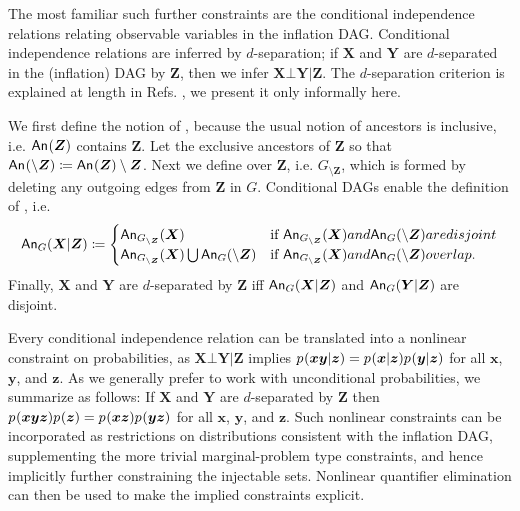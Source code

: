 {\begin{asparadesc}
\medskip\item[\tred{Conditional Independence Relations}] \noindent
\par\hspace{\parskip} 
The most familiar such further constraints are the conditional independence relations relating observable variables in the inflation DAG. Conditional independence relations are inferred by $d$-separation; if $\bm{X}$ and $\bm{Y}$ are $d$-separated in the (inflation) DAG by $\bm{Z}$, then we infer $\bm{X}\bot\bm{Y}|\bm{Z}$. The $d$-separation criterion is explained at length in Refs. \cite{pearl2009causality,studeny2005probabilistic,WoodSpekkens,pusey2014gdag}, we present it only informally here.

We first define the notion of , because the usual notion of ancestors is inclusive, i.e. $\An{\bm{Z}}$ contains $\bm{Z}$. Let the exclusive ancestors of $\bm{Z}$ so that $\An{\setminus\bm{Z}}\coloneqq\An{\bm{Z}}\setminus\bm{Z}$. Next we define  over $\bm{Z}$, i.e. $G_{\setminus\bm{Z}}$, which is formed by deleting any outgoing edges from $\bm{Z}$ in $G$. Conditional DAGs enable the definition of , i.e. 
\begin{align}
    \An[G]{\bm{X}|\bm{Z}}\coloneqq \begin{cases}
    \An[G_{\setminus\bm{Z}}]{\bm{X}}& \text{if } \An[G_{\setminus\bm{Z}}]{\bm{X}} and \An[G]{\setminus\bm{Z}} are disjoint\\
    \An[G_{\setminus\bm{Z}}]{\bm{X}} \bigcup \An[G]{\setminus\bm{Z}} & \text{if } \An[G_{\setminus\bm{Z}}]{\bm{X}} and \An[G]{\setminus\bm{Z}} overlap.
    \end{cases}
\end{align}
Finally, $\bm{X}$ and $\bm{Y}$ are $d$-separated by $\bm{Z}$ iff $\An[G]{\bm{X}|\bm{Z}}$ and $\An[G]{\bm{Y}|\bm{Z}}$ are disjoint.

Every conditional independence relation can be translated into a nonlinear constraint on probabilities, as $\bm{X}\bot\bm{Y}|\bm{Z}$ implies $\p{\bm{x}\bm{y}|\bm{z}}=\p{\bm{x}|\bm{z}}\p{\bm{y}|\bm{z}}$ for all $\bm{x}$, $\bm{y}$, and $\bm{z}$. As we generally prefer to work with unconditional probabilities, we summarize as follows: If $\bm{X}$ and $\bm{Y}$ are $d$-separated by $\bm{Z}$ then $\p{\bm{x}\bm{y}\bm{z}}\p{\bm{z}}=\p{\bm{x}\bm{z}}\p{\bm{y}\bm{z}}$ for all $\bm{x}$, $\bm{y}$, and $\bm{z}$. Such nonlinear constraints can be incorporated as restrictions on distributions consistent with the inflation DAG, supplementing the more trivial marginal-problem type constraints, and hence implicitly further constraining the injectable sets. Nonlinear quantifier elimination can then be used to make the implied constraints explicit.


\end{asparadesc}}
